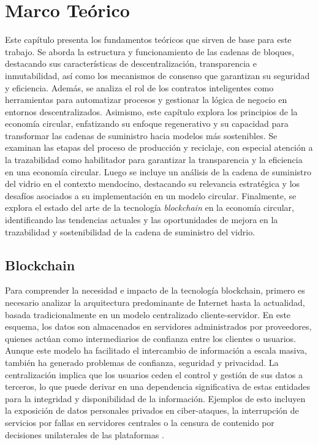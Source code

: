 \chapter[Marco Teórico]{Marco Teórico}
\label{cp:theoretical-framework}

\parindent0pt


Este capítulo presenta los fundamentos teóricos que sirven de base para este trabajo. Se aborda la estructura y funcionamiento de las cadenas de bloques, destacando sus características de descentralización, transparencia e inmutabilidad, así como los mecanismos de consenso que garantizan su seguridad y eficiencia. Además, se analiza el rol de los contratos inteligentes como herramientas para automatizar procesos y gestionar la lógica de negocio en entornos descentralizados. Asimismo, este capítulo explora los principios de la economía circular, enfatizando su enfoque regenerativo y su capacidad para transformar las cadenas de suministro hacia modelos más sostenibles. Se examinan las etapas del proceso de producción y reciclaje, con especial atención a la trazabilidad como habilitador para garantizar la transparencia y la eficiencia en una economía circular. Luego se incluye un análisis de la cadena de suministro del vidrio en el contexto mendocino, destacando su relevancia estratégica y los desafíos asociados a su implementación en un modelo circular. Finalmente, se explora el estado del arte de la tecnología \textit{blockchain} en la economía circular, identificando las tendencias actuales y las oportunidades de mejora en la trazabilidad y sostenibilidad de la cadena de suministro del vidrio.

\section{Blockchain}

Para comprender la necesidad e impacto de la tecnología blockchain, primero es necesario analizar la arquitectura predominante de Internet hasta la actualidad, basada tradicionalmente en un modelo centralizado cliente-servidor. En este esquema, los datos son almacenados en servidores administrados por proveedores, quienes actúan como intermediarios de confianza entre los clientes o usuarios. Aunque este modelo ha facilitado el intercambio de información a escala masiva, también ha generado problemas de confianza, seguridad y privacidad. La centralización implica que los usuarios ceden el control y gestión de sus datos a terceros, lo que puede derivar en una dependencia significativa de estas entidades para la integridad y disponibilidad de la información. Ejemplos de esto incluyen la exposición de datos personales privados en ciber-ataques, la interrupción de servicios por fallas en servidores centrales o la censura de contenido por decisiones unilaterales de las plataformas \cite{pending}.

